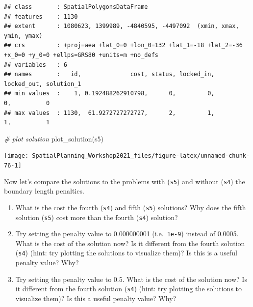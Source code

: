 \documentclass[
  12pt,
]{book}
\newenvironment{Shaded}{\begin{snugshade}}{\end{snugshade}}
\newcommand{\CommentTok}[1]{\textcolor[rgb]{0.56,0.35,0.01}{\textit{#1}}}
\newcommand{\FunctionTok}[1]{\textcolor[rgb]{0.00,0.00,0.00}{#1}}
\newcommand{\NormalTok}[1]{#1}
\providecommand{\tightlist}{%
  \setlength{\itemsep}{0pt}\setlength{\parskip}{0pt}}
\begin{document}
\begin{verbatim}
## class       : SpatialPolygonsDataFrame 
## features    : 1130 
## extent      : 1080623, 1399989, -4840595, -4497092  (xmin, xmax, ymin, ymax)
## crs         : +proj=aea +lat_0=0 +lon_0=132 +lat_1=-18 +lat_2=-36 +x_0=0 +y_0=0 +ellps=GRS80 +units=m +no_defs 
## variables   : 6
## names       :   id,              cost, status, locked_in, locked_out, solution_1 
## min values  :    1, 0.192488262910798,      0,         0,          0,          0 
## max values  : 1130,  61.9272727272727,      2,         1,          1,          1
\end{verbatim}

\begin{Shaded}
\begin{Highlighting}[]
\CommentTok{\# plot solution}
\FunctionTok{plot\_solution}\NormalTok{(s5)}
\end{Highlighting}
\end{Shaded}

\begin{center}\texttt{[image: SpatialPlanning\_Workshop2021\_files/figure-latex/unnamed-chunk-76-1]} \end{center}

Now let's compare the solutions to the problems with (\texttt{s5}) and without (\texttt{s4}) the boundary length penalties.

\begin{rmdquestion}
\begin{enumerate}
\def\labelenumi{\arabic{enumi}.}
\tightlist
\item
  What is the cost the fourth (\texttt{s4}) and fifth (\texttt{s5}) solutions? Why does the fifth solution (\texttt{s5}) cost more than the fourth (\texttt{s4}) solution?
\item
  Try setting the penalty value to 0.000000001 (i.e.~\texttt{1e-9}) instead of 0.0005. What is the cost of the solution now? Is it different from the fourth solution (\texttt{s4}) (hint: try plotting the solutions to visualize them)? Is this is a useful penalty value? Why?
\item
  Try setting the penalty value to 0.5. What is the cost of the solution now? Is it different from the fourth solution (\texttt{s4}) (hint: try plotting the solutions to visualize them)? Is this a useful penalty value? Why?
\end{enumerate}
\end{rmdquestion}

\clearpage
\end{document}
